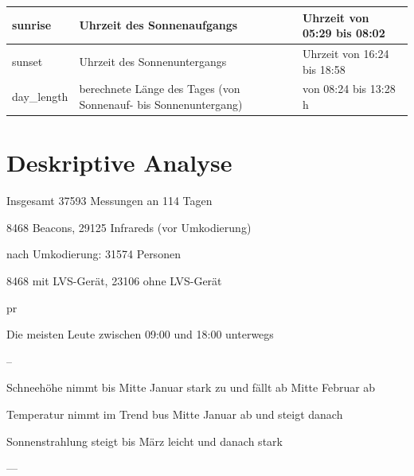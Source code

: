 \documentclass[12pt]{scrreprt}
\begin{document}
\begin{table}
\begin{adjustbox}{max width=\textwidth}
\begin{tabular}{l|l|l}
\hline

sunrise & Uhrzeit des Sonnenaufgangs & Uhrzeit von 05:29 bis 08:02 \\

\hline

sunset & Uhrzeit des Sonnenuntergangs & Uhrzeit von 16:24 bis 18:58 \\

\hline

day\_length & berechnete Länge des Tages (von Sonnenauf- bis Sonnenuntergang) & von 08:24 bis 13:28 h \\

\hline

\end{tabular}

\end{adjustbox}

\label{tab:var}

\end{table}



\chapter{Deskriptive Analyse}

Insgesamt 37593 Messungen an 114 Tagen



8468 Beacons, 29125 Infrareds (vor Umkodierung)



nach Umkodierung: 31574 Personen



8468 mit LVS-Gerät, 23106 ohne LVS-Gerät

pr

Die meisten Leute zwischen 09:00 und 18:00 unterwegs



--



Schneehöhe nimmt bis Mitte Januar stark zu und fällt ab Mitte Februar ab



Temperatur nimmt im Trend bus Mitte Januar ab und steigt danach



Sonnenstrahlung steigt bis März leicht und danach stark





---
\end{document}
